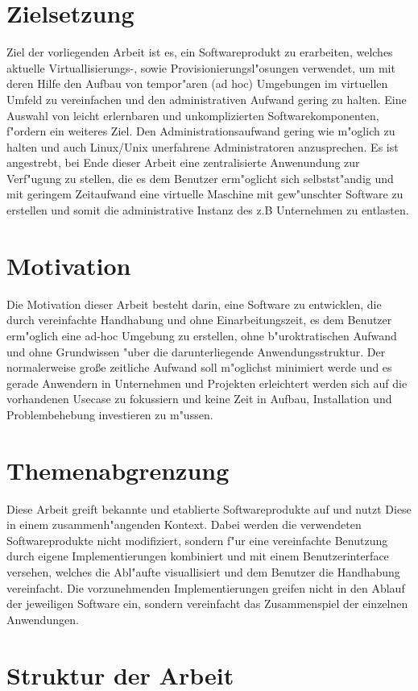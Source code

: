 \section{Zielsetzung}
Ziel der vorliegenden Arbeit ist es, ein Softwareprodukt zu erarbeiten, welches aktuelle Virtuallisierungs-, sowie Provisionierungsl"osungen verwendet, um mit deren Hilfe den Aufbau von tempor"aren (ad hoc) Umgebungen im virtuellen Umfeld zu vereinfachen und den administrativen Aufwand gering zu halten.\newline
Eine Auswahl von leicht erlernbaren und unkomplizierten Softwarekomponenten, f"ordern ein weiteres Ziel. Den Administrationsaufwand gering wie m"oglich zu halten und auch Linux/Unix unerfahrene Administratoren anzusprechen.\newline
Es ist angestrebt, bei Ende dieser Arbeit eine zentralisierte Anwenundung zur Verf"ugung zu stellen, die es dem Benutzer erm"oglicht sich selbstst"andig und mit geringem Zeitaufwand eine virtuelle Maschine mit gew"unschter Software zu erstellen und somit die administrative Instanz des z.B Unternehmen zu entlasten.

\section{Motivation}
Die Motivation dieser Arbeit besteht darin, eine Software zu entwicklen, die durch vereinfachte Handhabung und ohne Einarbeitungszeit, es dem Benutzer erm"oglich eine ad-hoc Umgebung zu erstellen, ohne b"uroktratischen Aufwand und ohne Grundwissen "uber die darunterliegende Anwendungsstruktur.
Der normalerweise gro{\ss}e zeitliche Aufwand soll m"oglichst minimiert werde und es gerade Anwendern in Unternehmen und Projekten erleichtert werden sich auf die vorhandenen Usecase zu fokussiern und keine Zeit in Aufbau, Installation und Problembehebung investieren zu m"ussen.

\section{Themenabgrenzung}
Diese Arbeit greift bekannte und etablierte Softwareprodukte auf und nutzt Diese in einem zusammenh"angenden Kontext. Dabei werden die verwendeten Softwareprodukte nicht modifiziert, sondern f"ur eine vereinfachte Benutzung durch eigene Implementierungen kombiniert und mit einem Benutzerinterface versehen, welches die Abl"aufte visuallisiert und dem Benutzer die Handhabung vereinfacht.
Die vorzunehmenden Implementierungen greifen nicht in den Ablauf der jeweiligen Software ein, sondern vereinfacht das Zusammenspiel der einzelnen Anwendungen.

\section{Struktur der Arbeit}

